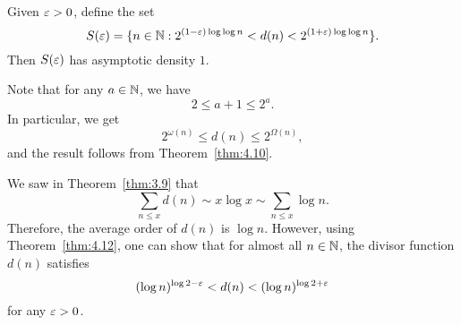 \begin{thm}\label{thm:4.12} 
    Given $\varepsilon > 0$, define the set 
    \[ S(\varepsilon) = \{n \in \mathbb{N} : 2^{(1-\varepsilon)\log\log n} < d(n) < 2^{(1+\varepsilon)\log\log n} \}. \] 
    Then $S(\varepsilon)$ has asymptotic density $1$. 
\end{thm}
\begin{pf}
    Note that for any $a \in \mathbb{N}$, we have 
    \[ 2 \leq a + 1 \leq 2^a. \] 
    In particular, we get 
    \[ 2^{\omega(n)} \leq d(n) \leq 2^{\Omega(n)}, \] 
    and the result follows from Theorem~\ref{thm:4.10}. 
\end{pf}

\begin{remark}\label{remark:4.13}
    We saw in Theorem~\ref{thm:3.9} that 
    \[ \sum_{n\leq x} d(n) \sim x\log x \sim \sum_{n\leq x}\log n. \] 
    Therefore, the average order of $d(n)$ is $\log n$. However, using 
    Theorem~\ref{thm:4.12}, one can show that for almost all $n \in \mathbb{N}$, the 
    divisor function $d(n)$ satisfies 
    \[ (\log n)^{\log 2 - \varepsilon} < d(n) < (\log n)^{\log 2 + \varepsilon} \] 
    for any $\varepsilon > 0$. 
\end{remark}